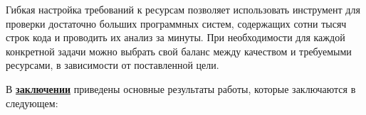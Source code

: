 Гибкая настройка требований к ресурсам позволяет использовать инструмент для проверки достаточно больших программных систем, содержащих сотни тысяч строк кода и проводить их анализ за минуты.
При необходимости для каждой конкретной задачи можно выбрать свой баланс между качеством и требуемыми ресурсами, в зависимости от поставленной цели. 

В \underline{\textbf{заключении}} приведены основные результаты работы, которые заключаются в следующем:





